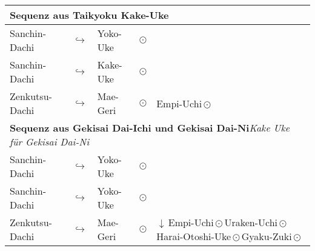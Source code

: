 	\null\vfill\null
	\begin{tabularx}{\textwidth}{lllllll}
		\multicolumn{7}{l}{\textbf{Sequenz aus Taikyoku Kake-Uke}}\\
		\midrule
		Sanchin-Dachi 	& \(\hookrightarrow\) & Yoko-Uke	&\multicolumn{4}{l}{\(\odot\)}\\
		Sanchin-Dachi 	& \(\hookrightarrow\) & Kake-Uke	&\multicolumn{4}{l}{\(\odot\)}\\
		Zenkutsu-Dachi	& \(\hookrightarrow\) & Mae-Geri	& \(\odot\) & Empi-Uchi\,\(\odot\)&&\\
		\midrule
		\multicolumn{7}{l}{\textbf{Sequenz aus Gekisai Dai-Ichi und Gekisai Dai-Ni\quad}\textit{\scriptsize Kake Uke für Gekisai Dai-Ni}}\\
		\midrule	
		Sanchin-Dachi 	& \(\hookrightarrow\) 	& Yoko-Uke	&\multicolumn{3}{l}{\(\odot\)} &\\
		Sanchin-Dachi 	& \(\hookrightarrow\) 	& Yoko-Uke	&\multicolumn{3}{l}{\(\odot\)} &\\
		Zenkutsu-Dachi 	& \(\hookrightarrow\) 	& Mae-Geri	&\(\odot\)	& \multicolumn{3}{l}{\(\downarrow\)\,Empi-Uchi\,\(\odot\)\,Uraken-Uchi\,\(\odot\)\,Harai-Otoshi-Uke\,\(\odot\)\,Gyaku-Zuki\,\(\odot\)}\\
		\midrule							
	\end{tabularx}\\\null\vfill\null